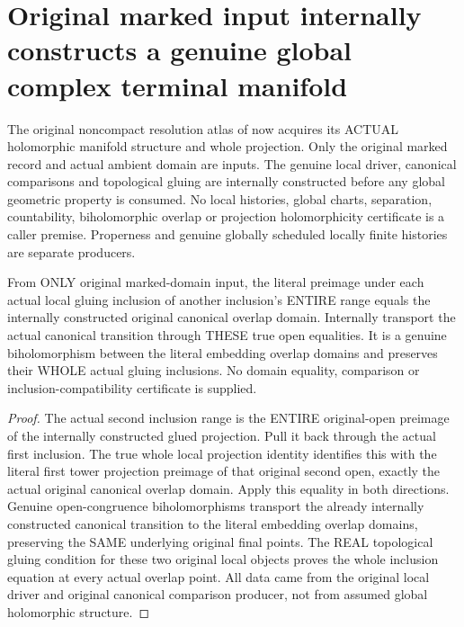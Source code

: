 \section{Original marked input internally constructs a genuine global complex terminal manifold}

The original noncompact resolution atlas of
\cite{wlodarczyk05-hironaka,bierstone-milman08-functoriality} now acquires
its ACTUAL holomorphic manifold structure and whole projection. Only the
original marked record and actual ambient domain are inputs. The genuine
local driver, canonical comparisons and topological gluing are internally
constructed before any global geometric property is consumed. No local
histories, global charts, separation, countability, biholomorphic overlap
or projection holomorphicity certificate is a caller premise. Properness
and genuine globally scheduled locally finite histories are separate producers.

\begin{lemma}
\label{hir:original-terminal-global-actual-embedding-overlap-geometry}
\leanok
{}
From ONLY original marked-domain input, the literal preimage under each
actual local gluing inclusion of another inclusion's ENTIRE range equals
the internally constructed original canonical overlap domain. Internally
transport the actual canonical transition through THESE true open equalities.
It is a genuine biholomorphism between the literal embedding overlap domains
and preserves their WHOLE actual gluing inclusions. No domain equality,
comparison or inclusion-compatibility certificate is supplied.
\end{lemma}
\begin{proof}
The actual second inclusion range is the ENTIRE original-open preimage
of the internally constructed glued projection. Pull it back through the
actual first inclusion. The true whole local projection identity identifies
this with the literal first tower projection preimage of that original
second open, exactly the actual original canonical overlap domain. Apply
this equality in both directions. Genuine open-congruence biholomorphisms
transport the already internally constructed canonical transition to the
literal embedding overlap domains, preserving the SAME underlying original
final points. The REAL topological gluing condition for these two original
local objects proves the whole inclusion equation at every actual overlap
point. All data came from the original local driver and original canonical
comparison producer, not from assumed global holomorphic structure.
\end{proof}

